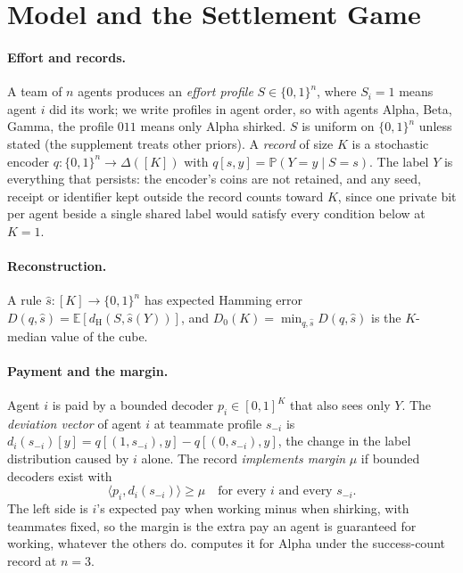 \documentclass[sigconf,anonymous,acmthm=false]{acmart}
\theoremstyle{acmplain}
\theoremstyle{acmdefinition}
\newcommand{\E}{\mathbb{E}}
\newcommand{\Pb}{\mathbb{P}}
\newcommand{\dH}{d_{\mathrm{H}}}
\newcommand{\shat}{\hat{s}}
\newcommand{\cube}{\{0,1\}}
\newcommand{\A}{\textsf{Alpha}}
\newcommand{\B}{\textsf{Beta}}
\newcommand{\G}{\textsf{Gamma}}
\begin{document}
\section{Model and the Settlement Game}\label{sec:model}

\paragraph{Effort and records.} A team of $n$ agents produces an \emph{effort profile}
$S\in\cube^n$, where $S_i=1$ means agent $i$ did its work; we write profiles in agent order,
so with agents \A, \B, \G, the profile $011$ means only \A{} shirked. $S$ is uniform on
$\cube^n$ unless stated (the supplement treats other priors). A \emph{record} of size $K$
is a stochastic encoder $q:\cube^n\to\Delta([K])$ with $q[s,y]=\Pb(Y=y\mid S=s)$. The label
$Y$ is everything that persists: the encoder's coins are not retained, and any seed, receipt
or identifier kept outside the record counts toward $K$, since one private bit per agent
beside a single shared label would satisfy every condition below at $K=1$.

\paragraph{Reconstruction.} A rule $\shat:[K]\to\cube^n$ has expected Hamming error
$D(q,\shat)=\E[\dH(S,\shat(Y))]$, and $D_0(K)=\min_{q,\shat}D(q,\shat)$ is the $K$-median
value of the cube.

\paragraph{Payment and the margin.} Agent $i$ is paid by a bounded decoder $p_i\in[0,1]^K$
that also sees only $Y$. The \emph{deviation vector} of agent $i$ at teammate profile
$s_{-i}$ is $d_i(s_{-i})[y]=q[(1,s_{-i}),y]-q[(0,s_{-i}),y]$, the change in the label
distribution caused by $i$ alone. The record \emph{implements margin} $\mu$ if bounded
decoders exist with
\begin{equation}\label{eq:M}\tag{M}
\langle p_i,d_i(s_{-i})\rangle\ge\mu\quad\text{for every } i \text{ and every } s_{-i}.
\end{equation}
The left side is $i$'s expected pay when working minus when shirking, with teammates fixed,
so the margin is the extra pay an agent is guaranteed for working, whatever the others do.
 computes it for \A{} under the success-count record at $n=3$.
\end{document}
